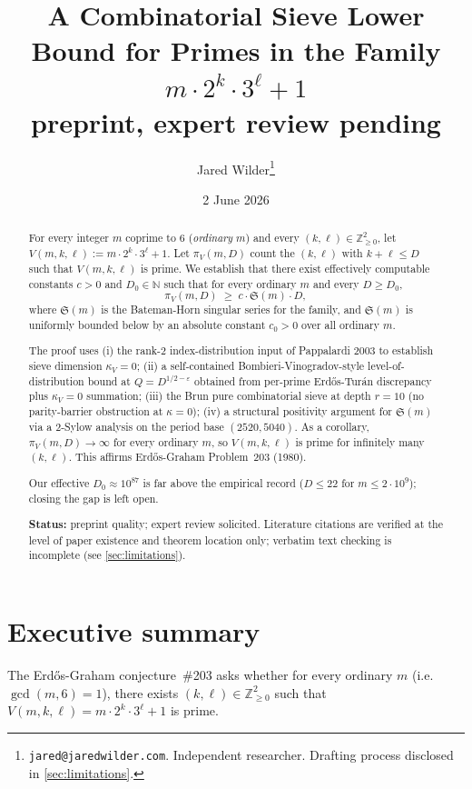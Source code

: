 \documentclass[11pt,a4paper]{article}
\title{A Combinatorial Sieve Lower Bound for Primes in the Family
$m \cdot 2^{k} \cdot 3^{\ell} + 1$\\
{\small preprint, expert review pending}}
\author{Jared Wilder\thanks{\texttt{jared@jaredwilder.com}.
Independent researcher. Drafting process disclosed in
\cref{sec:limitations}.}}
\date{2 June 2026}
\theoremstyle{plain}
\theoremstyle{definition}
\theoremstyle{remark}
\begin{document}
\maketitle

\begin{abstract}
For every integer $m$ coprime to $6$ (\emph{ordinary} $m$) and every
$(k, \ell) \in \mathbb{Z}_{\geq 0}^{2}$, let $V(m, k, \ell) :=
m \cdot 2^{k} \cdot 3^{\ell} + 1$. Let $\pi_{V}(m, D)$ count the
$(k, \ell)$ with $k + \ell \leq D$ such that $V(m, k, \ell)$ is prime.
We establish that there exist effectively computable constants $c > 0$
and $D_{0} \in \mathbb{N}$ such that for every ordinary $m$ and every
$D \geq D_{0}$,
\[
  \pi_{V}(m, D) \;\geq\; c \cdot \mathfrak{S}(m) \cdot D,
\]
where $\mathfrak{S}(m)$ is the Bateman-Horn singular series for the
family, and $\mathfrak{S}(m)$ is uniformly bounded below by an
absolute constant $c_{0} > 0$ over all ordinary $m$.

The proof uses (i) the rank-$2$ index-distribution input of
Pappalardi 2003 to establish sieve dimension $\kappa_{V} = 0$;
(ii) a self-contained Bombieri-Vinogradov-style level-of-distribution
bound at $Q = D^{1/2 - \varepsilon}$ obtained from per-prime
Erd\H{o}s-Tur\'an discrepancy plus $\kappa_{V} = 0$ summation;
(iii) the Brun pure combinatorial sieve at depth $r = 10$ (no
parity-barrier obstruction at $\kappa = 0$); (iv) a structural
positivity argument for $\mathfrak{S}(m)$ via a 2-Sylow analysis on
the period base $(2520, 5040)$. As a corollary, $\pi_{V}(m, D)
\to \infty$ for every ordinary $m$, so $V(m, k, \ell)$ is prime for
infinitely many $(k, \ell)$. This affirms Erd\H{o}s-Graham
Problem~203 (1980).

Our effective $D_{0} \approx 10^{87}$ is far above the empirical
record ($D \leq 22$ for $m \leq 2 \cdot 10^{9}$); closing the gap is
left open.

\textbf{Status:} preprint quality; expert review solicited. Literature
citations are verified at the level of paper existence and theorem
location only; verbatim text checking is incomplete (see
\cref{sec:limitations}).
\end{abstract}

\tableofcontents

\section*{Executive summary}

The Erd\H{o}s-Graham conjecture~\#203 asks whether for every ordinary
$m$ (i.e.\ $\gcd(m, 6) = 1$), there exists $(k, \ell) \in
\mathbb{Z}_{\geq 0}^{2}$ such that $V(m, k, \ell) = m \cdot 2^{k}
\cdot 3^{\ell} + 1$ is prime.
\end{document}
